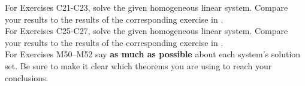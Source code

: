 %
%
For Exercises C21-C23, solve the given homogeneous linear system.  Compare your results to the results of the corresponding exercise in .\\
%
%
For Exercises C25-C27, solve the given homogeneous linear system.  Compare your results to the results of the corresponding exercise in .\\
%
%
%
%
For Exercises M50--M52  say {\bf as much as possible} about each system's solution set.  Be sure to make it clear which theorems you are using to reach your conclusions.\\
%
